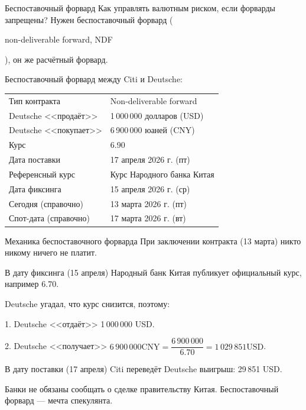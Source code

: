 \documentclass{beamer}
\newcommand{\en}[1]{\begin{otherlanguage}{english}#1\end{otherlanguage}}
\begin{document}
\begin{frame}{Беспоставочный форвард}
\justify
Как управлять валютным риском, если форварды запрещены? Нужен \alert{беспоставочный форвард} (\en{non-deliverable forward, NDF}), он же расчётный форвард.

\justify
Беспоставочный форвард между Citi и Deutsche:

\justify
\centering
\begin{tabular}{l|l}
	Тип контракта 		   & Non-deliverable forward		\\
	Deutsche <<продаёт>>  & 1\,000\,000 долларов (USD)	\\
	Deutsche <<покупает>> & 6\,900\,000 юаней (CNY)		\\
	Курс		 		      & 6.90 						\\
	Дата поставки		   & 17 апреля 2026 г. (пт) \\
	Референсный курс	   & Курс Народного банка Китая	\\
	Дата фиксинга		   & 15 апреля 2026 г. (ср) \\
	Сегодня (справочно)	& 13 марта 2026 г. (пт) \\
	Спот-дата (справочно) & 17 марта 2026 г. (вт)
\end{tabular}
\end{frame}



\begin{frame}{Механика беспоставочного форварда}
\justify
При заключении контракта (13 марта) никто никому ничего не платит.

\justify
В дату фиксинга (15 апреля) Народный банк Китая публикует официальный курс, например 6.70.

\justify
Deutsche угадал, что курс снизится, поэтому:

1. Deutsche <<отдаёт>> 1\,000\,000 USD.

2. Deutsche <<получает>> $6\,900\,000 \text{CNY} = \dfrac{6\,900\,000}{6.70} = 1\,029\,851 \text{USD}$.

\justify
В дату поставки (17 апреля) Citi переведёт Deutsche выигрыш: 29\,851 USD.

\justify Банки не обязаны сообщать о сделке правительству Китая. Беспоставочный форвард --- мечта спекулянта.
\end{frame}
\end{document}
